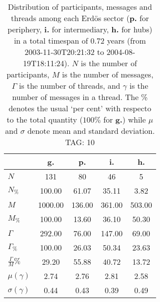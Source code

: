 \begin{table}[h!]
\begin{center}
\begin{tabular}{| l | c | c | c | c |}\hline
 & g. & p. & i. & h. \\\hline
$N$ & 131  & 80  & 46  & 5 \\\hline
$N_{\%}$ & 100.00  & 61.07  & 35.11  & 3.82 \\\hline
$M$ & 1000.00  & 136.00  & 361.00  & 503.00 \\\hline
$M_{\%}$ & 100.00  & 13.60  & 36.10  & 50.30 \\\hline
$\Gamma$ & 292.00  & 76.00  & 147.00  & 69.00 \\\hline
$\Gamma_{\%}$ & 100.00  & 26.03  & 50.34  & 23.63 \\\hline
$\frac{\Gamma}{M}\%$ & 29.20  & 55.88  & 40.72  & 13.72 \\\hline
$\mu(\gamma)$ & 2.74  & 2.76  & 2.81  & 2.58 \\\hline
$\sigma(\gamma)$ & 0.44  & 0.43  & 0.39  & 0.49 \\\hline
\end{tabular}
\caption{Distribution of participants, messages and threads among each Erd\"os sector ({\bf p.} for periphery, {\bf i.} for intermediary, 
    {\bf h.} for hubs) in a total timespan of 0.72 years (from 2003-11-30T20:21:32 to 2004-08-19T18:11:24). $N$ is the number of participants, $M$ is the number of messages, $\Gamma$ is the number of threads, and $\gamma$ is the number of messages in a thread.
    The \% denotes the usual `per cent' with respecto to the total quantity ($100\%$ for {\bf g.})
    while $\mu$ and $\sigma$ denote mean and standard deviation. TAG: 10}
\end{center}
\end{table}